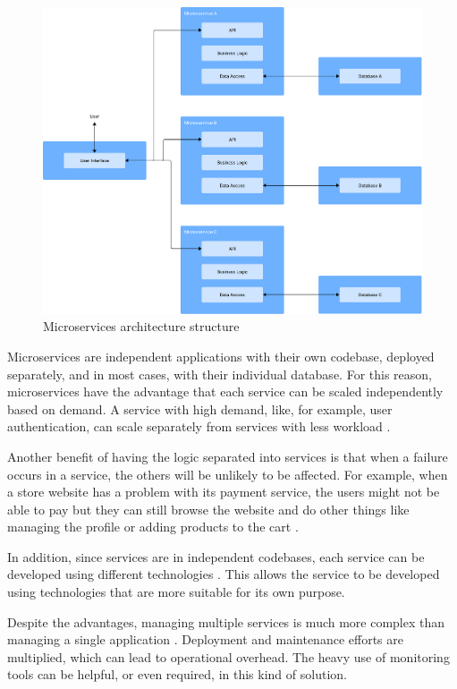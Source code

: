 \begin{figure}[htbp]
	\centering
	\includegraphics[width=\textwidth, height=0.5\textheight, keepaspectratio]{Chapters/Figures/Architectures/microservices.pdf}
	\caption{Microservices architecture structure}
	\label{fig:architectures:microservices}
\end{figure}

Microservices are independent applications with their own codebase, deployed
separately, and in most cases, with their individual database. For this reason,
microservices have the advantage that each service can be scaled independently based on demand. A service with
high demand, like, for example, user authentication, can scale separately from
services with less workload \cite{8990350}.

Another benefit of having the logic separated into services is that when
a failure occurs in a service, the others will be unlikely to be affected. For
example, when a store website has a problem with its payment service, the
users might not be able to pay but they can still browse the website and
do other things like managing the profile or adding products to the cart \cite{8990350}.

In addition, since services are in independent codebases, each service
can be developed using different technologies \cite{7436659}. This allows the service to
be developed using technologies that are more suitable for its own purpose.

Despite the advantages, managing multiple services is much more complex than managing a single
application \cite{newman2019monolith}. Deployment and maintenance efforts are multiplied, which can
lead to operational overhead. The heavy use of monitoring tools can be
helpful, or even required, in this kind of solution.

